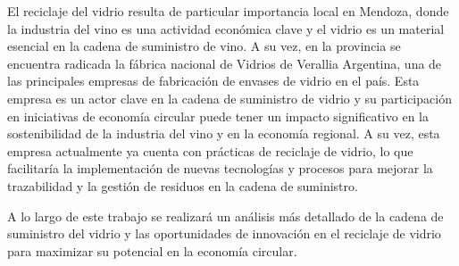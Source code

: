 \documentclass[main.tex]{subfiles}
\begin{document}
El reciclaje del vidrio resulta de particular importancia local en Mendoza, donde la industria del vino es una actividad económica clave y el vidrio es un material esencial en la cadena de suministro de vino. A su vez, en la provincia se encuentra radicada la fábrica nacional de Vidrios de Verallia Argentina, una de las principales empresas de fabricación de envases de vidrio en el país. Esta empresa es un actor clave en la cadena de suministro de vidrio y su participación en iniciativas de economía circular puede tener un impacto significativo en la sostenibilidad de la industria del vino y en la economía regional. A su vez, esta empresa actualmente ya cuenta con prácticas de reciclaje de vidrio, lo que facilitaría la implementación de nuevas tecnologías y procesos para mejorar la trazabilidad y la gestión de residuos en la cadena de suministro.

A lo largo de este trabajo se realizará un análisis más detallado de la cadena de suministro del vidrio y las oportunidades de innovación en el reciclaje de vidrio para maximizar su potencial en la economía circular.
\end{document}

